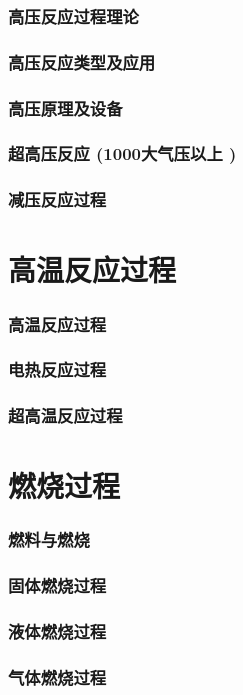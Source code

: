 \documentclass[UTF8]{../03-Chemistry}
\begin{document}
    \subsubsection{高压反应过程理论}
    \subsubsection{高压反应类型及应用}
    \subsubsection{高压原理及设备}
    \subsubsection{超高压反应 (1000大气压以上 )}
    \subsubsection{减压反应过程}

\section{高温反应过程}
    \subsubsection{高温反应过程}
    \subsubsection{电热反应过程}
    \subsubsection{超高温反应过程}


\section{燃烧过程}
    \subsubsection{燃料与燃烧}
    \subsubsection{固体燃烧过程}
    \subsubsection{液体燃烧过程}
    \subsubsection{气体燃烧过程}
\end{document}
